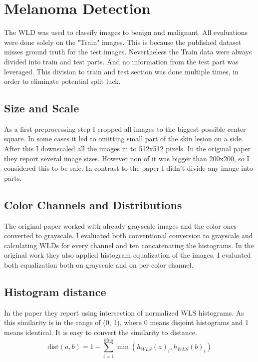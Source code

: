 \documentclass[a4paper,10pt,twocolumn]{article}
\begin{document}
\section{Melanoma Detection}

The WLD was used to classify images\cite{isicarchiveISIC2020} to benign and malignant.
All evaluations were done solely on the "Train" images.
This is because the published dataset misses ground truth for the test images.
Nevertheless the Train data were always divided into train and test parts.
And no information from the test part was leveraged.
This division to train and test section was done multiple times, in order to eliminate potential split luck.

\subsection{Size and Scale}

As a first preprocessing step I cropped all images to the biggest possible center square.
In some cases it led to omitting small part of the skin lesion on a side.
After this I downscaled all the images in to 512x512 pixels.
In the original paper they report several image sizes.
However non of it was bigger than 200x200, so I considered this to be safe.
In contrast to the paper I didn't divide any image into parts.

\subsection{Color Channels and Distributions}

The original paper worked with already grayscale images and the color ones converted to grayscale.
I evaluated both conventional conversion to grayscale and calculating WLDs for every channel and ten concatenating the histograms.
In the original work they also applied histogram equalization of the images.
I evaluated both equalization both on grayscale and on per color channel.

\subsection{Histogram distance}

In the paper they report using intersection of normalized WLS histograms.
As this similarity is in the range of (0, 1), where 0 means disjoint histograms and 1 means identical.
It is easy to convert the similarity to distance. 
$$\textrm{dist}(a, b) = 1 - \sum_{i=1}^{bins} \min(h_{WLS}(a)_i, h_{WLS}(b)_i)$$
\end{document}
